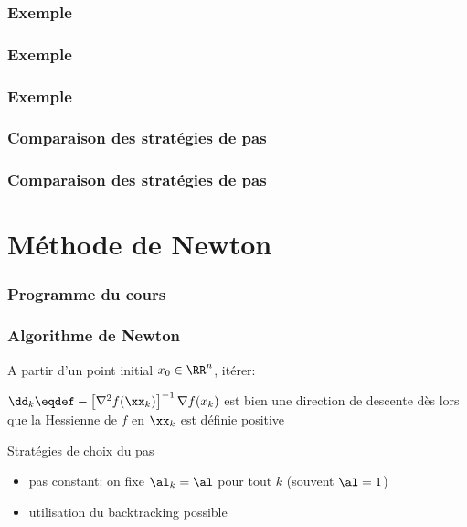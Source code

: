\documentclass[9pt,table]{beamer} %
\begin{document}
\begin{frame}
\frametitle{Exemple}
\begin{figure}
	
\end{figure}
\end{frame}


\begin{frame}
\frametitle{Exemple}
\begin{figure}
	
\end{figure}
\end{frame}

\begin{frame}
\frametitle{Exemple}
\begin{figure}
	
\end{figure}
\end{frame}


\begin{frame}
\frametitle{Comparaison des stratégies de pas}

\begin{figure}
	
\end{figure}
\end{frame}

\begin{frame}
\frametitle{Comparaison des stratégies de pas}


\end{frame}


\section{Méthode de Newton}
\begin{frame}
\frametitle{Programme du cours}
\tableofcontents[currentsection]
\end{frame}


\begin{frame}
\frametitle{Algorithme de Newton}

\begin{tcolorbox}
	A partir d'un point initial $x_0 \in \RR^n$, itérer:
\end{tcolorbox}

	$\dd_k \eqdef - \left[\nabla^2 f(\xx_k)\right]^{-1} \nabla f(x_k)$ est bien une direction de descente dès lors que la Hessienne de $f$ en $\xx_k$ est définie positive
	
	
	\alert{Stratégies de choix du pas}
	\begin{itemize}[label=-]
		\item pas constant: on fixe $\al_k = \al$ pour tout $k$ (souvent $\al=1$)
		\item utilisation du backtracking possible
	\end{itemize}
\end{frame}
\end{document}
